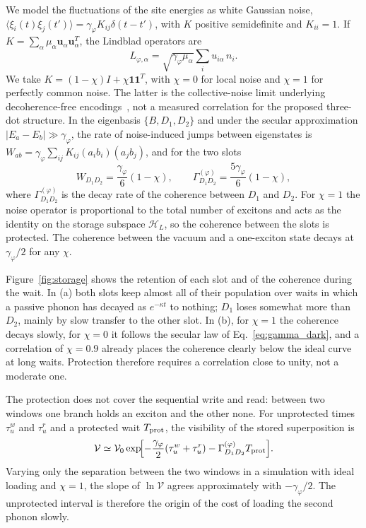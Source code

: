 \documentclass[aps,pra,preprint,groupedaddress,amsmath,amssymb,floatfix]{revtex4-2}
\begin{document}
We model the fluctuations of the site energies as white Gaussian noise, $\langle\xi_i(t)\xi_j(t')\rangle=\gamma_\varphi K_{ij}\delta(t-t')$, with $K$ positive semidefinite and $K_{ii}=1$. If $K=\sum_\alpha\mu_\alpha\bm u_\alpha\bm u_\alpha^T$, the Lindblad operators are
\begin{equation}
L_{\varphi,\alpha}=\sqrt{\gamma_\varphi\mu_\alpha}\sum_iu_{i\alpha}\,n_i.\label{eq:noisejumps}
\end{equation}
We take $K=(1-\chi)I+\chi\bm1\bm1^T$, with $\chi=0$ for local noise and $\chi=1$ for perfectly common noise. The latter is the collective-noise limit underlying decoherence-free encodings~\cite{lidar1998,friesen2017}, not a measured correlation for the proposed three-dot structure. In the eigenbasis $\{B,D_1,D_2\}$ and under the secular approximation $|E_a-E_b|\gg\gamma_\varphi$, the rate of noise-induced jumps between eigenstates is $W_{ab}=\gamma_\varphi\sum_{ij}K_{ij}(a_ib_i)(a_jb_j)$, and for the two slots
\begin{equation}
W_{D_1D_2}=\frac{\gamma_\varphi}{6}(1-\chi),\qquad
\Gamma_{D_1D_2}^{(\varphi)}=\frac{5\gamma_\varphi}{6}(1-\chi),\label{eq:gamma_dark}
\end{equation}
where $\Gamma_{D_1D_2}^{(\varphi)}$ is the decay rate of the coherence between $D_1$ and $D_2$. For $\chi=1$ the noise operator is proportional to the total number of excitons and acts as the identity on the storage subspace $\mathcal H_L$, so the coherence between the slots is protected. The coherence between the vacuum and a one-exciton state decays at $\gamma_\varphi/2$ for any $\chi$.

Figure~\ref{fig:storage} shows the retention of each slot and of the coherence during the wait. In (a) both slots keep almost all of their population over waits in which a passive phonon has decayed as $e^{-\kappa t}$ to nothing; $D_1$ loses somewhat more than $D_2$, mainly by slow transfer to the other slot. In (b), for $\chi=1$ the coherence decays slowly, for $\chi=0$ it follows the secular law of Eq.~\eqref{eq:gamma_dark}, and a correlation of $\chi=0.9$ already places the coherence clearly below the ideal curve at long waits. Protection therefore requires a correlation close to unity, not a moderate one.

The protection does not cover the sequential write and read: between two windows one branch holds an exciton and the other none. For unprotected times $\tau_u^w$ and $\tau_u^r$ and a protected wait $T_{\rm prot}$, the visibility of the stored superposition is
\begin{equation}
\mathcal V\simeq\mathcal V_0\exp\!\Bigl[-\frac{\gamma_\varphi}{2}(\tau_u^w+\tau_u^r)-\Gamma_{D_1D_2}^{(\varphi)}T_{\rm prot}\Bigr].\label{eq:visibility}
\end{equation}
Varying only the separation between the two windows in a simulation with ideal loading and $\chi=1$, the slope of $\ln\mathcal V$ agrees approximately with $-\gamma_\varphi/2$. The unprotected interval is therefore the origin of the cost of loading the second phonon slowly.
\end{document}
